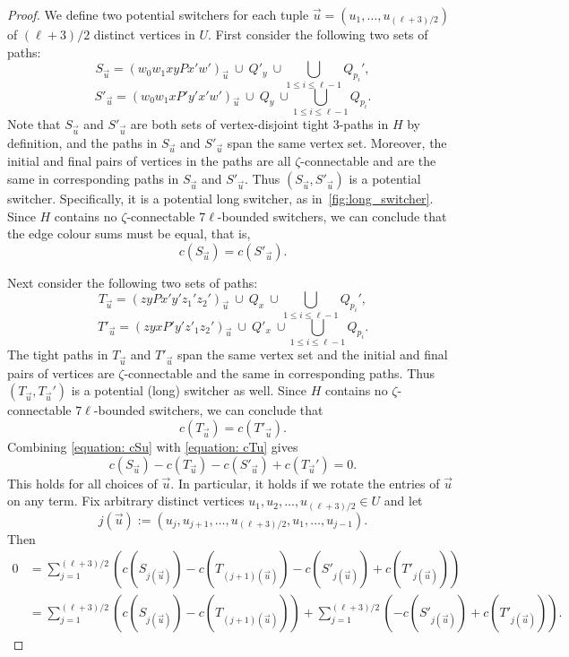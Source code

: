 \documentclass[A4paper,12pt]{article}
\theoremstyle{definition}
\begin{document}
\begin{proof}
    We define two potential switchers for each tuple $\vec{u} = (u_1,\ldots,u_{(\ell+3)/2})$ of $(\ell+3)/2$ distinct vertices in $U$. 
    First consider the following  two sets of paths:
    \[S_{\vec{u}} = (w_0w_1xyPx'w')_{\vec{u}} ~ \cup ~ Q'_{y} ~ \cup \bigcup_{1\le i\le\ell-1} Q_{p_i}',\]
    \[S'_{\vec{u}} = (w_0w_1xP'y'x'w')_{\vec{u}} ~ \cup ~ Q_{y} ~ \cup \bigcup_{1\le i\le\ell-1} Q_{p_i}.\]
    Note that $S_{\vec{u}}$ and $S'_{\vec{u}}$ are both sets of vertex-disjoint tight 3-paths in $H$ by definition, and the paths in $S_{\vec{u}}$ and $S'_{\vec{u}}$ span the same vertex set. Moreover, the initial and final pairs of vertices in the paths are all $\zeta$-connectable and are the same in corresponding paths in $S_{\vec{u}}$ and $S'_{\vec{u}}$. Thus $(S_{\vec{u}},S'_{\vec{u}})$ is a potential switcher. Specifically, it is a potential long switcher, as in~\cref{fig:long_switcher}. Since $H$ contains no $\zeta$-connectable $7\ell$-bounded switchers, we can conclude that the edge colour sums must be equal, that is,
    \begin{equation}
    \label{equation: cSu}
    c( S_{\vec{u}}) = c( S'_{\vec{u}}).
    \end{equation}

    
    Next consider the following  two sets of paths:    
    \[T_{\vec{u}} = (zyPx'y'z_1'z_2')_{\vec{u}} ~ \cup ~ Q_{x} ~ \cup \bigcup_{1\le i\le\ell-1} Q_{p_i}',\]
    \[T'_{\vec{u}} = (zyxP'y'z'_1z_2')_{\vec{u}} ~ \cup ~ Q'_{x} ~ \cup \bigcup_{1\le i\le\ell-1} Q_{p_i}.\]
    The tight paths in $T_{\vec{u}}$ and $T'_{\vec{u}}$ span the same vertex set and the initial and final pairs of vertices are $\zeta$-connectable and the same in corresponding paths. Thus $(T_{\vec{u}},T_{\vec{u}}')$ is a potential (long) switcher as well. Since $H$ contains no $\zeta$-connectable $7\ell$-bounded switchers, we can conclude that 
        \begin{equation}
    \label{equation: cTu}
    c(T_{\vec{u}}) = c( T'_{\vec{u}}).
    \end{equation}
    Combining \eqref{equation: cSu} with \eqref{equation: cTu} gives
    \[
    c(S_{\vec{u}}) - c(T_{\vec{u}}) - c( S'_{\vec{u}}) + c( T_{\vec{u}}') = 0.
    \]
    This holds for all choices of $\vec{u}$. In particular, it holds if we rotate the entries of $\vec{u}$ on any term. Fix arbitrary distinct vertices $u_1,u_2,\ldots,u_{(\ell+3)/2} \in U$ and let $$j(\vec{u}) := (u_j,u_{j+1},\ldots,u_{(\ell+3)/2},u_1,\ldots,u_{j-1}).$$
    Then 
        \begin{align} 0 &= \sum_{j=1}^{(\ell+3)/2}\left(
    c(S_{j(\vec{u})}) - c(T_{(j+1)(\vec{u})}) - c( S'_{j(\vec{u})}) + c( T'_{j(\vec{u})}) \right)\nonumber\\
    &= \sum_{j=1}^{(\ell+3)/2}\left(
   c(S_{j(\vec{u})}) - c(T_{(j+1)(\vec{u})})\right) + \sum_{j=1}^{(\ell+3)/2}\left( -c( S'_{j(\vec{u})}) +c( T'_{j(\vec{u})}) \right). \label{eq:edge_score_sum}
    \end{align}


\end{proof}
\end{document}

